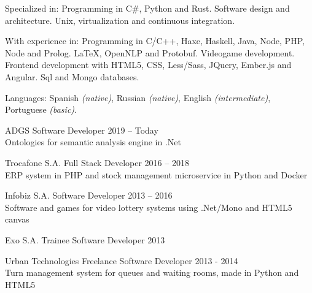 \documentclass[10pt,a4paper]{article}
\begin{document}

\inlineheadsection
  { Specialized in: }
  { Programming in C\#, Python and Rust. Software design and architecture. Unix, virtualization and continuous integration.}

\inlineheadsection
  { With experience in: }
  { Programming in C/C++, Haxe, Haskell, Java, Node, PHP, Node and Prolog. \LaTeX, OpenNLP and Protobuf. Videogame development. Frontend development with HTML5, CSS, Less/Sass, JQuery, Ember.js and Angular. Sql and Mongo databases. }

  \vspace{0.5em}
\inlineheadsection
  { Languages: }
  { Spanish \emph{(native)}, Russian \emph{(native)}, English \emph{(intermediate)}, Portuguese \emph{(basic)}.}


\spacedhrule{1.9em}{-0.4em} %






\vspace{0.2em}
\headedsection
    { ADGS }
    { \textsc{} }{
    \headedsubsection
        { Software Developer }
        { 2019 -- Today }
        { \\ Ontologies for semantic analysis engine in .Net \href{http://www.tasmo.ai/}{\ExternalLink} }
}

\vspace{0.2em}
\headedsection
    { Trocafone S.A. }
    { \textsc{} }{
    \headedsubsection
        { Full Stack Developer }
        { 2016 -- 2018 }
        { \\ ERP system in PHP and stock management microservice in Python and Docker }
}

\vspace{0.2em}
\headedsection
    { Infobiz S.A. }
    { \textsc{} }{
    \headedsubsection
        { Software Developer }
        { 2013 -- 2016 }
        { \\ Software and games for video lottery systems using .Net/Mono and HTML5 canvas \href{http://www.infobiz.com.ar/english/ticket_games.php}{\ExternalLink} }
}

\vspace{0.2em}
\headedsection
    { Exo S.A. }
    { \textsc{} }{
    \headedsubsection
        { Trainee Software Developer }
        { 2013 }
        {}
}

\vspace{0.2em}
\headedsection
    { Urban Technologies }
    { \textsc{} }{
    \headedsubsection
        { Freelance Software Developer }
        { 2013 - 2014}
        { \\ Turn management system for queues and waiting rooms, made in Python and HTML5 \href{http://www.eitsa.com.ar/producto.php?c=3&p=14}{\ExternalLink} }
}
\end{document}
